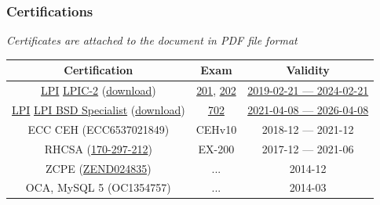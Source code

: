 \documentclass {article}
\begin{document}
        \subsubsection {Certifications}
          \begin{center}
            \textit {Certificates are attached to the document in PDF file format} \\
            \begin {tabular} { | c | c | c | }
              \hline			
              \textbf {Certification} & \textbf {Exam} & \textbf {Validity} \\
              \hline  
              
              \href{https://en.wikipedia.org/wiki/Linux_Professional_Institute}{LPI} \href{https://www.lpi.org/our-certifications/lpic-2-overview}{LPIC-2} (\href{https://cs.lpi.org/caf/Xamman/candidate_area/certificate/LPIC-2/bafrejwgeb}{download}) & \href{https://www.lpi.org/our-certifications/exam-201-objectives}{201}, \href{https://www.lpi.org/our-certifications/exam-202-objectives}{202} & \href{https://cs.lpi.org/caf/Xamman/certification/verify/LPI000307519/bafrejwgeb}{2019-02-21 --- 2024-02-21} \\

              \href{https://en.wikipedia.org/wiki/Linux_Professional_Institute}{LPI} \href{https://www.lpi.org/our-certifications/bsd-overview}{LPI BSD Specialist} (\href{https://cs.lpi.org/caf/Xamman/candidate_area/certificate/BSDS/mvuk2szhhw}{download}) & \href{https://www.lpi.org/our-certifications/exam-702-objectives}{702} & \href{https://cs.lpi.org/caf/Xamman/certification/verify/LPI000307519/mvuk2szhhw}{2021-04-08 --- 2026-04-08} \\

              ECC CEH (ECC6537021849) & CEHv10 &  2018-12 --- 2021-12 \\

              RHCSA (\href{https://rhtapps.redhat.com/verify?certId=170-297-212}{170-297-212}) & EX-200 & 2017-12 --- 2021-06 \\

              ZCPE (\href{https://www.zend-zce.com/en/yellow-pages/ZEND024835}{ZEND024835}) & ... & 2014-12 \\

              OCA, MySQL 5 (OC1354757) &  ... & 2014-03 \\

              \hline  
            \end{tabular}
          \end{center}
\end{document}
